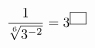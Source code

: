 $\dfrac{1}{\sqrt[6]{3^{-2}}}=3^{\text{\scriptsize\setlength{\fboxsep}{1.5pt}\framebox[1.5em]{\rule{0pt}{1.6ex}}}}$
